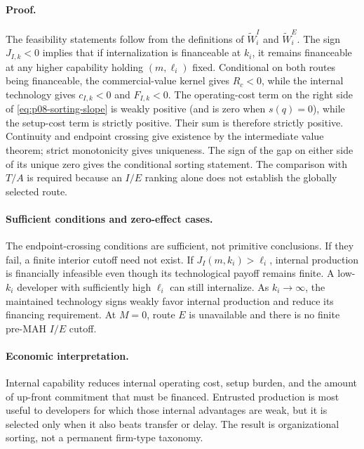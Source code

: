 \paragraph{Proof.}
The feasibility statements follow from the definitions of
\(\widetilde W_i^I\) and \(\widetilde W_i^E\). The sign \(J_{I,k}<0\) implies
that if internalization is financeable at \(k_i\), it remains financeable at
any higher capability holding \((m,\ell_i)\) fixed. Conditional on both routes
being financeable, the commercial-value kernel gives \(R_c<0\), while the internal technology
gives \(c_{I,k}<0\) and \(F_{I,k}<0\).
The operating-cost term on the right side of
\eqref{eq:p08-sorting-slope} is weakly positive (and is zero when
\(s(q)=0\)), while the setup-cost term is strictly positive. Their sum is
therefore strictly positive. Continuity and endpoint crossing give existence
by the intermediate value theorem; strict monotonicity gives uniqueness. The sign of
the gap on either side of its unique zero gives the conditional sorting
statement. The comparison with \(T/A\) is required because an \(I/E\) ranking
alone does not establish the globally selected route.

\paragraph{Sufficient conditions and zero-effect cases.}
The endpoint-crossing conditions are sufficient, not primitive conclusions.
If they fail, a finite interior cutoff need not exist. If
\(J_I(m,k_i)>\ell_i\), internal production is financially infeasible even
though its technological payoff remains finite. A low-\(k_i\) developer with
sufficiently high \(\ell_i\) can still internalize. As
\(k_i\rightarrow\infty\), the maintained technology signs weakly favor
internal production and reduce its financing requirement. At \(M=0\), route
\(E\) is unavailable and there is no finite pre-MAH \(I/E\) cutoff.

\paragraph{Economic interpretation.}
Internal capability reduces internal operating cost, setup burden, and the
amount of up-front commitment that must be financed.
Entrusted production is most useful to developers for which those internal
advantages are weak, but it is selected only when it also beats transfer or
delay. The result is organizational sorting, not a permanent firm-type
taxonomy.

